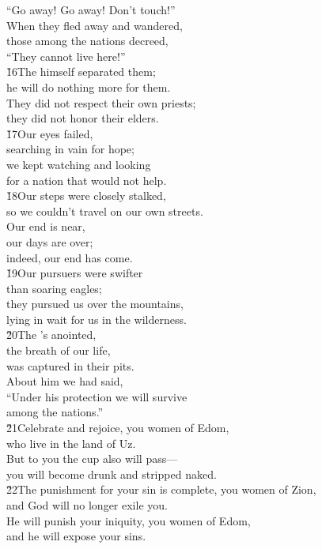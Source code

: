 \begin{poetry}
\poemlll       ``Go away! Go away! Don't touch!'' \\
\poeml When they fled away and wandered, \\
\poemll    those among the nations decreed, \\
\poemlll       ``They cannot live here!'' \\
\poeml \v{16}The  himself separated them; \\
\poemll    he will do nothing more for them. \\
\poeml They did not respect their own priests; \\
\poemll    they did not honor their elders. \\
\poeml \v{17}Our eyes failed, \\
\poemll    searching in vain for hope; \\
\poeml we kept watching and looking \\
\poemll    for a nation that would not help. \\
\poeml \v{18}Our steps were closely stalked, \\
\poemll    so we couldn't travel on our own streets. \\
\poeml Our end is near, \\
\poemll    our days are over; \\
\poemlll       indeed, our end has come. \\
\poeml \v{19}Our pursuers were swifter \\
\poemll    than soaring eagles; \\
\poeml they pursued us over the mountains, \\
\poemll    lying in wait for us in the wilderness. \\
\poeml \v{20}The 's anointed, \\
\poemll    the breath of our life, \\
\poemlll       was captured in their pits. \\
\poeml About him we had said, \\
\poemll    ``Under his protection we will survive \\
\poemlll       among the nations.'' \\
\poeml \v{21}Celebrate and rejoice, you women of Edom, \\
\poemll    who live in the land of Uz. \\
\poeml But to you the cup also will pass--- \\
\poemll    you will become drunk and stripped naked. \\
\poeml \v{22}The punishment for your sin is complete, you women of Zion, \\
\poemll    and God will no longer exile you. \\
\poeml He will punish your iniquity, you women of Edom, \\
\poemll    and he will expose your sins.
\end{poetry}

